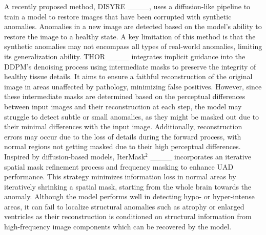 A recently proposed method, DISYRE ____, uses a diffusion-like pipeline to train a model to restore images that have been corrupted with synthetic anomalies. Anomalies in a new image are detected based on the model's ability to restore the image to a healthy state. A key limitation of this method is that the synthetic anomalies may not encompass all types of real-world anomalies, limiting its generalization ability. THOR ____ integrates implicit guidance into the DDPM's denoising process using intermediate masks to preserve the integrity of healthy tissue details. It aims to ensure a faithful reconstruction of the original image in areas unaffected by pathology, minimizing false positives. However, since these intermediate masks are determined based on the perceptual differences between input images and their reconstruction at each step, the model may struggle to detect subtle or small anomalies, as they might be masked out due to their minimal differences with the input image. Additionally, reconstruction errors may occur due to the loss of details during the forward process, with normal regions not getting masked due to their high perceptual differences. Inspired by diffusion-based models, IterMask$^2$ ____ incorporates an iterative spatial mask refinement process and frequency masking to enhance UAD performance. This strategy minimizes information loss in normal areas by iteratively shrinking a spatial mask, starting from the whole brain towards the anomaly. Although the model performs well in detecting hypo- or hyper-intense areas, it can fail to localize structural anomalies such as atrophy or enlarged ventricles as their reconstruction is conditioned on structural information from high-frequency image components which can be recovered by the model.